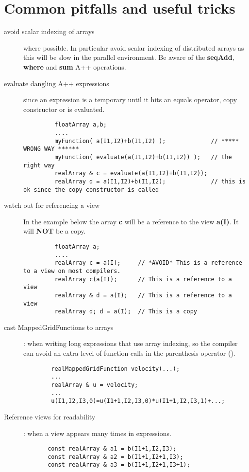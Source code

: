\documentclass{article}
\begin{document}
\section{Common pitfalls and useful tricks}


\begin{description}
  \item[avoid scalar indexing of arrays]  where possible. In particular avoid scalar indexing of
    distributed arrays as this will be slow in the parallel environment. 
   Be aware of the {\bf seqAdd}, {\bf where} and {\bf sum} A++ operations.
  \item[evaluate dangling A++ expressions] since an expression is a temporary until it hits
    an equals operator, copy constructor or is evaluated.
    \begin{verbatim}
         floatArray a,b;
         ....
         myFunction( a(I1,I2)+b(I1,I2) );             // ***** WRONG WAY ******
         myFunction( evaluate(a(I1,I2)+b(I1,I2)) );   // the right way
         realArray & c = evaluate(a(I1,I2)+b(I1,I2));
         realArray d = a(I1,I2)+b(I1,I2);             // this is ok since the copy constructor is called
    \end{verbatim}
  \item[watch out for referencing a view] In the example below the array {\bf c} will be a reference
    to the view {\bf a(I)}. It will {\bf NOT} be a copy.
    \begin{verbatim}
         floatArray a;
         ....
         realArray c = a(I);     // *AVOID* This is a reference to a view on most compilers.
         realArray c(a(I));      // This is a reference to a view
         realArray & d = a(I);   // This is a reference to a view
         realArray d; d = a(I);  // This is a copy
    \end{verbatim}
  \item[cast MappedGridFunctions to arrays] : when writing long expressions that use array indexing, so
    the compiler can avoid an extra level of function calls in the parenthesis operator ().
    \begin{verbatim}
        realMappedGridFunction velocity(...);
        ...
        realArray & u = velocity;
        ...
        u(I1,I2,I3,0)=u(I1+1,I2,I3,0)*u(I1+1,I2,I3,1)+...;
    \end{verbatim}
  \item[Reference views for readability] : when a view appears many times in expressions.
    \begin{verbatim}
       const realArray & a1 = b(I1+1,I2,I3);      
       const realArray & a2 = b(I1+1,I2+1,I3);      
       const realArray & a3 = b(I1+1,I2+1,I3+1);      


\end{verbatim}
\end{description}
\end{document}
